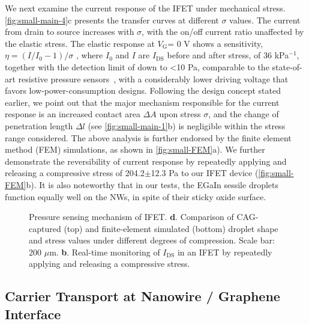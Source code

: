 We next examine the current response of the IFET under mechanical
stress.  \autoref{fig:small-main-4}c presents the transfer curves at
different \(\sigma\) values. The current from drain to source
increases with \(\sigma\), with the on/off current ratio unaffected by
the elastic stress. The elastic response at \(V_{\mathrm{G}}\)= 0 V
shows a sensitivity, \(\eta = (I/I_{0} - 1) / \sigma\) , where
\(I_{0}\) and \(I\) are \(I_{\mathrm{DS}}\) before and after stress,
of 36 kPa\(^{-1}\), together with the detection limit of down to
\textless{}10 Pa, comparable to the state-of-art resistive pressure
sensors~\autocite{Mannsfeld_2010_pressure,Pang_2012_gauge,Pan_2014_pressure,Zang_2015_suspend_gate_FET},
with a considerably lower driving voltage that favors
low-power-consumption designs.
%
Following the design concept stated earlier, we point out that the
major mechanism responsible for the current response is an increased
contact area \(\Delta A\) upon stress \(\sigma\), and the change of
penetration length \(\Delta l\) (see \autoref{fig:small-main-1}b) is
negligible within the stress range considered.  The above analysis is
further endorsed by the finite element method (FEM) simulations, as
shown in \autoref{fig:small-FEM}a).  We further demonstrate the
reversibility of current response by repeatedly applying and releasing
a compressive stress of 204.2\(\pm\)12.3 Pa to our IFET device
(\autoref{fig:small-FEM}b). It is also noteworthy that in our tests,
the EGaIn sessile droplets function equally well on the NWs, in spite
of their sticky oxide surface.
\begin{figure}[!htbp]
  \centering
  \caption{\label{fig:small-FEM} Pressure sensing mechanism of IFET.
    \textbf{d}.  Comparison of CAG-captured (top) and finite-element
    simulated (bottom) droplet shape and stress values under different
    degrees of compression. Scale bar: 200
    \(\mu\)m. \textbf{b}. Real-time monitoring of \(I_{\mathrm{DS}}\)
    in an IFET by repeatedly applying and releasing a compressive
    stress.}
\end{figure}

\subsection{Carrier Transport at Nanowire / Graphene Interface}
\label{sec:small-carrier-transport}

